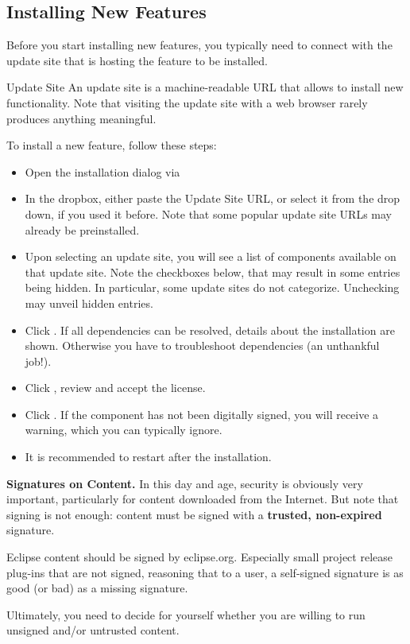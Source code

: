 \subsection{Installing New Features}
\label{sec:install-add-on}

Before you start installing new features, you typically need to connect with the update site that is hosting the feature to be installed.

\begin{definition}{Update Site}
An update site is a machine-readable URL that allows \pror{} to install new functionality.  Note that visiting the update site with a web browser rarely produces anything meaningful.
\end{definition}

To install a new feature, follow these steps:

\begin{itemize}
\item Open the installation dialog via 
\item In the  dropbox, either paste the Update Site URL, or select it from the drop down, if you used it before.  Note that some popular update site URLs may already be preinstalled.
\item Upon selecting an update site, you will see a list of components available on that update site.  Note the checkboxes below, that may result in some entries being hidden.  In particular, some update sites do not categorize.  Unchecking  may unveil hidden entries.
\item Click .  If all dependencies can be resolved, details about the installation are shown.  Otherwise you have to troubleshoot dependencies (an unthankful job!).
\item Click , review and accept the license.
\item Click .  If the component has not been digitally signed, you will receive a warning, which you can typically ignore.
\item It is recommended to restart after the installation.
\end{itemize}

\begin{info}
\textbf{Signatures on Content.}  In this day and age, security is obviously very important, particularly for content downloaded from the Internet.  But note that signing is not enough: content must be signed with a \textbf{trusted, non-expired} signature.

Eclipse content should be signed by eclipse.org.  Especially small project release plug-ins that are not signed, reasoning that to a user, a self-signed signature is as good (or bad) as a missing signature.

Ultimately, you need to decide for yourself whether you are willing to run unsigned and/or untrusted content.
\end{info}

